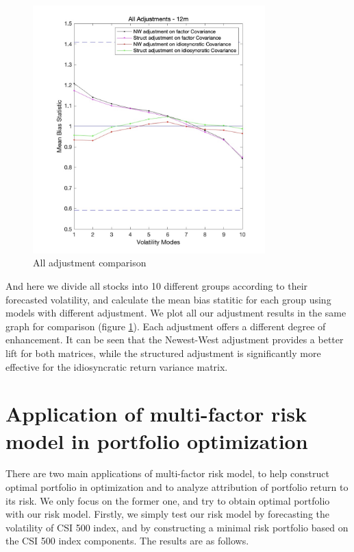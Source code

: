 \documentclass[10pt]{article}
\begin{document}
\begin{figure}
    \centering
    \includegraphics[width=0.8\textwidth,height=0.6\textwidth]{all adjust.png}
    \caption{All adjustment comparison}
    \label{fig:allad}
\end{figure}
And here we divide all stocks into 10 different groups according to their forecasted volatility, and calculate the mean bias statitic for each group using models with different adjustment. We plot all our adjustment results in the same graph for comparison (figure \ref{fig:allad}). Each adjustment offers a different degree of enhancement. It can be seen that the Newest-West adjustment provides a better lift for both matrices, while the structured adjustment is significantly more effective for the idiosyncratic return variance matrix.


\newpage
\section{Application of multi-factor risk model in portfolio optimization}
There are two main applications of multi-factor risk model, to help construct optimal portfolio in optimization and to analyze attribution of portfolio return to its risk. We only focus on the former one, and try to obtain optimal portfolio with our risk model.
Firstly, we simply test our risk model by forecasting the volatility of CSI 500 index, and by constructing a minimal risk portfolio based on the CSI 500 index components. The results are as follows.
\end{document}
